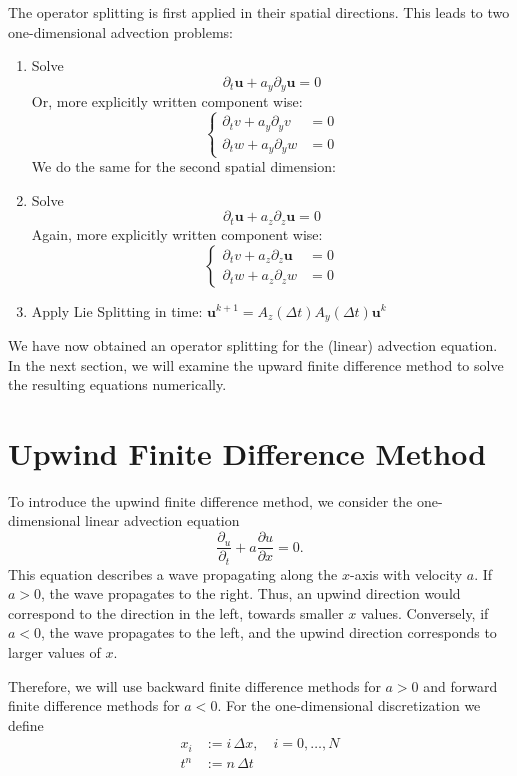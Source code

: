 The operator splitting is first applied in their spatial directions. This
leads to two one-dimensional advection problems:
\begin{enumerate}
    \item{Solve $$\partial_t \bm{u} + a_y\partial_y \bm{u} = 0 $$ Or, more
    explicitly written component wise: 
    $$ \begin{cases} \partial_t v + a_y \partial_y v &= 0 \\
    \partial_t w + a_y \partial_y w &= 0 \end{cases}$$} 
    We do the same for the second spatial dimension:
    \item{Solve $$\partial_t \bm{u} + a_z\partial_z \bm{u} = 0 $$ Again,
    more explicitly written component wise: 
    $$\begin{cases} \partial_t v + a_z \partial_z \bm{u} &= 0\\
    \partial_t w + a_z \partial_z w &= 0 \end{cases}$$} 
    \item{Apply Lie Splitting in time: $\bm{u}^{k+1} = 
        A_z(\Delta t)A_y(\Delta t)\bm{u}^{k}$}
\end{enumerate}
We have now obtained an operator splitting for the (linear) advection
equation. In the next section, we will examine the upward finite
difference method to solve the resulting equations numerically.

\section{Upwind Finite Difference Method}
To introduce the upwind finite difference method, we consider
the one-dimensional linear advection equation
$$\frac{\partial_u}{\partial_t}+a\frac{\partial u}{\partial x}=0.$$
This equation describes a wave propagating along the $x$-axis with
velocity $a$. If $a>0$, the wave propagates to the right. Thus, an upwind
direction would correspond to the direction in the left, towards smaller
$x$ values. Conversely, if $a<0$, the wave propagates to the left, and the
upwind direction corresponds to larger values of $x$.

Therefore, we will use backward finite difference methods for $a>0$ and
forward finite difference methods for $a<0$. For the one-dimensional
discretization we define
\[
\begin{aligned}
x_i &:= i \,\Delta x, \quad i = 0,\dots,N \\
t^n &:= n \,\Delta t
\end{aligned}
\]

